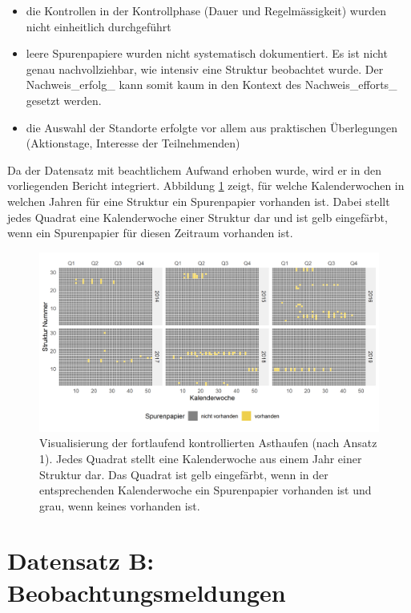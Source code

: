 \documentclass[
  oneside]{scrbook}
\providecommand{\tightlist}{%
  \setlength{\itemsep}{0pt}\setlength{\parskip}{0pt}}
\begin{document}
\begin{itemize}
\tightlist
\item
  die Kontrollen in der Kontrollphase (Dauer und Regelmässigkeit) wurden nicht einheitlich durchgeführt
\item
  leere Spurenpapiere wurden nicht systematisch dokumentiert. Es ist nicht genau nachvollziehbar, wie intensiv eine Struktur beobachtet wurde. Der Nachweis\_erfolg\_ kann somit kaum in den Kontext des Nachweis\_efforts\_ gesetzt werden.
\item
  die Auswahl der Standorte erfolgte vor allem aus praktischen Überlegungen (Aktionstage, Interesse der Teilnehmenden)
\end{itemize}

Da der Datensatz mit beachtlichem Aufwand erhoben wurde, wird er in den vorliegenden Bericht integriert. Abbildung \ref{fig:wirkungskontrollespontaneffort} zeigt, für welche Kalenderwochen in welchen Jahren für eine Struktur ein Spurenpapier vorhanden ist. Dabei stellt jedes Quadrat eine Kalenderwoche einer Struktur dar und ist gelb eingefärbt, wenn ein Spurenpapier für diesen Zeitraum vorhanden ist.



\begin{figure}
\includegraphics[width=1\linewidth]{images/wirkungskontrolle_spontan_effort} \caption{Visualisierung der fortlaufend kontrollierten Asthaufen (nach Ansatz 1). Jedes Quadrat stellt eine Kalenderwoche aus einem Jahr einer Struktur dar. Das Quadrat ist gelb eingefärbt, wenn in der entsprechenden Kalenderwoche ein Spurenpapier vorhanden ist und grau, wenn keines vorhanden ist.}\label{fig:wirkungskontrollespontaneffort}
\end{figure}

\hypertarget{datensatz-b-beobachtungsmeldungen}{%
\section{Datensatz B: Beobachtungsmeldungen}\label{datensatz-b-beobachtungsmeldungen}}
\end{document}
